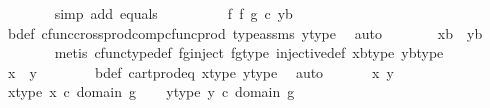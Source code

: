 \begin{isabellebody}
\ \ \ \ \ \ \isamarkupfalse%
\ {\isacharparenleft}{\kern0pt}simp\ add{\isacharcolon}{\kern0pt}\ equals{\isacharparenright}{\kern0pt}\isanewline
\ \ \ \ \isamarkupfalse%
\ \isamarkupfalse%
\ {\isachardoublequoteopen}{\isachardot}{\kern0pt}{\isachardot}{\kern0pt}{\isachardot}{\kern0pt}\ {\isacharequal}{\kern0pt}\ {\isacharparenleft}{\kern0pt}f\ {\isasymtimes}\isactrlsub f\ g{\isacharparenright}{\kern0pt}\ {\isasymcirc}\isactrlsub c\ {\isasymlangle}y{\isacharcomma}{\kern0pt}b{\isasymrangle}{\isachardoublequoteclose}\isanewline
\ \ \ \ \ \ \isamarkupfalse%
\ b{\isacharunderscore}{\kern0pt}def\ cfunc{\isacharunderscore}{\kern0pt}cross{\isacharunderscore}{\kern0pt}prod{\isacharunderscore}{\kern0pt}comp{\isacharunderscore}{\kern0pt}cfunc{\isacharunderscore}{\kern0pt}prod\ type{\isacharunderscore}{\kern0pt}assms\ y{\isacharunderscore}{\kern0pt}type{}\ \isamarkupfalse%
\ auto\isanewline
\ \ \ \ \isamarkupfalse%
\ \isamarkupfalse%
\ {\isachardoublequoteopen}{\isasymlangle}x{\isacharcomma}{\kern0pt}b{\isasymrangle}\ {\isacharequal}{\kern0pt}\ {\isasymlangle}y{\isacharcomma}{\kern0pt}b{\isasymrangle}{\isachardoublequoteclose}\isanewline
\ \ \ \ \ \ \isamarkupfalse%
\ {\isacharparenleft}{\kern0pt}metis\ cfunc{\isacharunderscore}{\kern0pt}type{\isacharunderscore}{\kern0pt}def\ fg{\isacharunderscore}{\kern0pt}inject\ fg{\isacharunderscore}{\kern0pt}type\ injective{\isacharunderscore}{\kern0pt}def\ xb{\isacharunderscore}{\kern0pt}type\ yb{\isacharunderscore}{\kern0pt}type{\isacharparenright}{\kern0pt}\isanewline
\ \ \ \ \isamarkupfalse%
\ \isamarkupfalse%
\ {\isachardoublequoteopen}x\ {\isacharequal}{\kern0pt}\ y{\isachardoublequoteclose}\isanewline
\ \ \ \ \ \ \isamarkupfalse%
\ b{\isacharunderscore}{\kern0pt}def\ cart{\isacharunderscore}{\kern0pt}prod{\isacharunderscore}{\kern0pt}eq{}\ x{\isacharunderscore}{\kern0pt}type{}\ y{\isacharunderscore}{\kern0pt}type{}\ \isamarkupfalse%
\ auto\isanewline
\ \ \isamarkupfalse%
\isanewline
{}\isamarkupfalse%
\isanewline
\ \ \isamarkupfalse%
\ x\ y\ \isanewline
\ \ \isamarkupfalse%
\ x{\isacharunderscore}{\kern0pt}type{\isacharcolon}{\kern0pt}\ {\isachardoublequoteopen}x\ {\isasymin}\isactrlsub c\ domain\ g{\isachardoublequoteclose}\isanewline
\ \ \isamarkupfalse%
\ y{\isacharunderscore}{\kern0pt}type{\isacharcolon}{\kern0pt}\ {\isachardoublequoteopen}y\ {\isasymin}\isactrlsub c\ domain\ g{\isachardoublequoteclose}\isanewline

\end{isabellebody}
